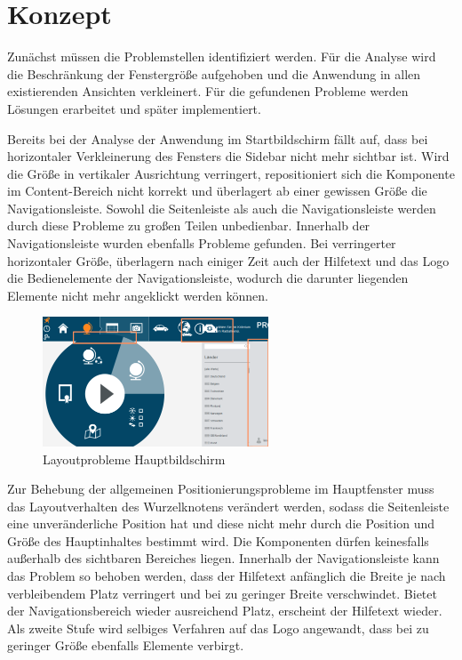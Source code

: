\section{Konzept} \label{sec:responsiveConcept}
Zunächst müssen die Problemstellen identifiziert werden. Für die Analyse wird die Beschränkung der Fenstergröße aufgehoben und die Anwendung in allen existierenden Ansichten verkleinert. Für die gefundenen Probleme werden Lösungen erarbeitet und später implementiert.\par
{}
Bereits bei der Analyse der Anwendung im Startbildschirm fällt auf, dass bei horizontaler Verkleinerung des Fensters die Sidebar nicht mehr sichtbar ist. Wird die Größe in vertikaler Ausrichtung verringert, repositioniert sich die Komponente im Content-Bereich nicht korrekt und überlagert ab einer gewissen Größe die Navigationsleiste. Sowohl die Seitenleiste als auch die Navigationsleiste werden durch diese Probleme zu großen Teilen unbedienbar. Innerhalb der Navigationsleiste wurden ebenfalls Probleme gefunden. Bei verringerter horizontaler Größe, überlagern nach einiger Zeit auch der Hilfetext und das Logo die Bedienelemente der Navigationsleiste, wodurch die darunter liegenden Elemente nicht mehr angeklickt werden können.\par
\begin{figure}[H]
 \centering
 \includegraphics[width=0.6\textwidth]{grafiken/radial_bug.png}
 \caption{Layoutprobleme Hauptbildschirm}
 \label{fig:layoutMainScreen}
\end{figure}
Zur Behebung der allgemeinen Positionierungsprobleme im Hauptfenster muss das Layoutverhalten des Wurzelknotens verändert werden, sodass die Seitenleiste eine unveränderliche Position hat und diese nicht mehr durch die Position und Größe des Hauptinhaltes bestimmt wird. Die Komponenten dürfen keinesfalls außerhalb des sichtbaren Bereiches liegen. Innerhalb der Navigationsleiste kann das Problem so behoben werden, dass der Hilfetext anfänglich die Breite je nach verbleibendem Platz verringert und bei zu geringer Breite verschwindet. Bietet der Navigationsbereich wieder ausreichend Platz, erscheint der Hilfetext wieder. Als zweite Stufe wird selbiges Verfahren auf das Logo angewandt, dass bei zu geringer Größe ebenfalls Elemente verbirgt.\par
